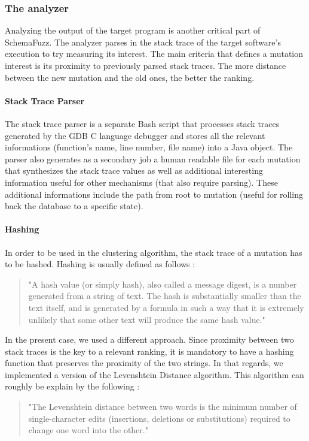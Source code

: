 \documentclass{article}
\begin{document}
\begin{empfile}
\bigskip
			\subsubsection{The analyzer}
Analyzing the output of the target program is another critical part of SchemaFuzz. The analyzer parses in the stack trace of the target software's execution to try measuring its interest. The main criteria that defines a mutation interest is its proximity to previously parsed stack traces. The more distance between the new mutation and the old ones, the better the ranking. %
				\paragraph{Stack Trace Parser}
The stack trace parser is a separate Bash script that processes stack traces generated by the GDB C language debugger and stores all the relevant informations (function's name, line number, file name) into a Java object. The parser also generates as a secondary job a human readable file for each mutation that synthesizes the stack trace values as well as additional interesting information useful for other mechanisms (that also require parsing). These additional informations include the path from root to mutation (useful for rolling back the database to a specific state).
				\paragraph{Hashing}
In order to be used in the clustering algorithm, the stack trace of a mutation has to be hashed.
Hashing is usually defined as follows : 
				\begin{quotation}
"A hash value (or simply hash), also called a message digest, is a number generated from a string of text. The hash is substantially smaller than the text itself, and is generated by a formula in such a way that it is extremely unlikely that some other text will produce the same hash value."
				\end{quotation}
				
In the present case, we used a different approach. Since proximity between two stack traces is the key to a relevant ranking, it is mandatory to have a hashing function that preserves the proximity of the two strings. 
In that regards, we implemented a version of the Levenshtein Distance algorithm.
This algorithm can roughly be explain by the following :
				\begin{quotation}
"The Levenshtein distance between two words is the minimum number of single-character edits (insertions, deletions or substitutions) required to change one word into the other."
				\end{quotation}				 
				

\end{empfile}
\end{document}
